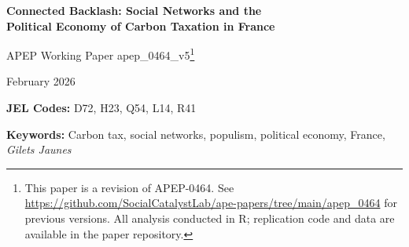 \documentclass[12pt]{article}
\newcommand{\rn}{Rassemblement National}
\newcommand{\gj}{\textit{Gilets Jaunes}}
\newcommand{\depts}{d\'{e}partements}
\begin{document}

\begin{titlepage}
\begin{center}
\vspace*{1cm}

{\LARGE\bfseries Connected Backlash: Social Networks and the\\
Political Economy of Carbon Taxation in France}

\vspace{1cm}

{\large APEP Working Paper apep\_0464\_v5\footnote{This paper is a revision of APEP-0464. See \url{https://github.com/SocialCatalystLab/ape-papers/tree/main/apep_0464} for previous versions. All analysis conducted in R; replication code and data are available in the paper repository.}}

\vspace{0.5cm}

{\large February 2026}

\vspace{1cm}

\begin{abstract}
\noindent Social networks transmitted the political backlash against France's carbon tax through economic and cultural channels. Using Facebook's Social Connectedness Index across 96 \depts{} and ten elections (2002--2024), I estimate a shift-share network fuel exposure effect of 1.35~pp on \rn{} vote share (0.87--1.35 under pre-trend adjustment). A horse-race reveals dual channels: fuel-specific network exposure contributes 0.58~pp ($p = 0.07$) while network exposure to low-immigration areas independently predicts RN support ($-1.41$~pp, $p < 0.01$), though the channels become collinear with local controls. An event study shows activation at the 2014 carbon tax introduction---before the 2018 \gj{} protests---and a timing decomposition confirms effects in both the early tax period and post-protest era. The effect is absent for Green and center-right parties, robust to a pre-treatment migration proxy, and survives a donut design.
\end{abstract}

\vspace{0.3cm}

\textbf{JEL Codes:} D72, H23, Q54, L14, R41

\textbf{Keywords:} Carbon tax, social networks, populism, political economy, France, \textit{Gilets Jaunes}

\end{center}
\end{titlepage}
\end{document}
